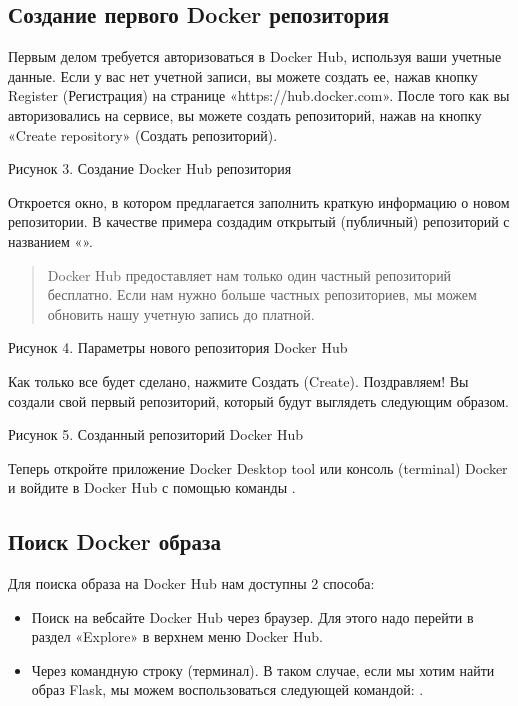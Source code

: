 \documentclass[letterpaper,10pt,russian]{sphinxmanual}
\begin{document}
\subsection{Создание первого Docker репозитория}
\label{\detokenize{educational_materials/docker_hub/content:id1}}
\sphinxAtStartPar
Первым делом требуется авторизоваться в Docker Hub, используя ваши учетные данные. Если у вас нет учетной записи, вы можете создать ее, нажав кнопку Register (Регистрация) на странице «https://hub.docker.com». После того как вы авторизовались на сервисе, вы можете создать репозиторий, нажав на кнопку «Create repository» (Создать репозиторий).

\sphinxAtStartPar
{}

\sphinxAtStartPar
Рисунок 3. Создание Docker Hub репозитория

\sphinxAtStartPar
Откроется окно, в котором предлагается заполнить краткую информацию о новом репозитории. В качестве примера создадим открытый (публичный) репозиторий с названием «».
\begin{quote}

\sphinxAtStartPar
Docker Hub предоставляет нам только один частный репозиторий бесплатно. Если нам нужно больше частных репозиториев, мы можем обновить нашу учетную запись до платной.
\end{quote}

\sphinxAtStartPar
{}

\sphinxAtStartPar
Рисунок 4. Параметры нового репозитория Docker Hub

\sphinxAtStartPar
Как только все будет сделано, нажмите Создать (Create).
Поздравляем! Вы создали свой первый репозиторий, который будут выглядеть следующим образом.

\sphinxAtStartPar
{}

\sphinxAtStartPar
Рисунок 5. Созданный репозиторий Docker Hub

\sphinxAtStartPar
Теперь откройте приложение Docker Desktop tool или консоль (terminal) Docker и войдите в Docker Hub с помощью команды .


\subsection{Поиск Docker образа}
\label{\detokenize{educational_materials/docker_hub/content:id2}}
\sphinxAtStartPar
Для поиска образа на Docker Hub нам доступны 2 способа:
\begin{itemize}
\item {} 
\sphinxAtStartPar
Поиск на веб\sphinxhyphen{}сайте Docker Hub через браузер. Для этого надо перейти в раздел «Explore» в верхнем меню Docker Hub.

\item {} 
\sphinxAtStartPar
Через командную строку (терминал). В таком случае, если мы хотим найти образ Flask, мы можем воспользоваться следующей командой: .

\end{itemize}
\end{document}
